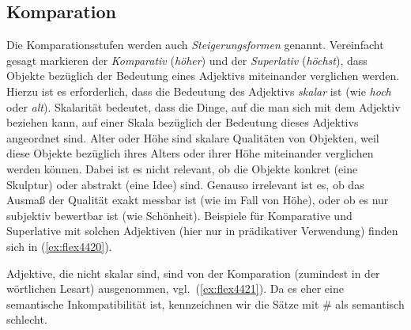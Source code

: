 \subsection{Komparation}

\label{sec:komparation}


Die Komparationsstufen werden auch \textit{Steigerungsformen} genannt.
Vereinfacht gesagt markieren der \textit{Komparativ} (\zB \textit{höher}) und der \textit{Superlativ} (\textit{höchst}), dass Objekte bezüglich der Bedeutung eines Adjektivs miteinander verglichen werden.
Hierzu ist es erforderlich, dass die Bedeutung des Adjektivs \textit{skalar} ist (wie \zB \textit{hoch} oder \textit{alt}).
Skalarität bedeutet, dass die Dinge, auf die man sich mit dem Adjektiv beziehen kann, auf einer Skala bezüglich der Bedeutung dieses Adjektivs angeordnet sind.
Alter oder Höhe sind \zB skalare Qualitäten von Objekten, weil diese Objekte bezüglich ihres Alters oder ihrer Höhe miteinander verglichen werden können.
Dabei ist es nicht relevant, ob die Objekte konkret (\zB eine Skulptur) oder abstrakt (\zB eine Idee) sind.
Genauso irrelevant ist es, ob das Ausmaß der Qualität exakt messbar ist (wie im Fall von Höhe), oder ob es nur subjektiv bewertbar ist (wie Schönheit).
Beispiele für Komparative und Superlative mit solchen Adjektiven (hier nur in prädikativer Verwendung) finden sich in (\ref{ex:flex4420}).

\begin{exe}
  \ex \label{ex:flex4420}
  \begin{xlist}
  \end{xlist}
\end{exe}

Adjektive, die nicht skalar sind, sind von der Komparation (zumindest in der wörtlichen Lesart) ausgenommen, vgl.\ (\ref{ex:flex4421}).
Da es eher eine semantische Inkompatibilität ist, kennzeichnen wir die Sätze mit \# als semantisch schlecht.

\begin{exe}
  \ex \label{ex:flex4421}
  \begin{xlist}
  \end{xlist}
\end{exe}

